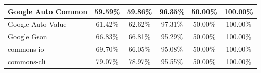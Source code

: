 \documentclass[../../main]{subfiles}
\begin{document}
\begin{table}[htb]
\begin{tabular}{|l|c|c|c|c|c|}
Google Auto Common            & 59.59\%                                                                                 & 59.86\%                                                                                     & 96.35\%                                                                              & 50.00\%                                                                               & 100.00\%                                                                             \\ \hline
Google Auto Value             & 61.42\%                                                                                 & 62.62\%                                                                                     & 97.31\%                                                                              & 50.00\%                                                                               & 100.00\%                                                                             \\ \hline
Google Gson                   & 66.83\%                                                                                 & 66.81\%                                                                                     & 95.29\%                                                                              & 50.00\%                                                                               & 100.00\%                                                                             \\ \hline
commons-io                    & 69.70\%                                                                                 & 66.05\%                                                                                     & 95.08\%                                                                              & 50.00\%                                                                               & 100.00\%                                                                             \\ \hline
commons-cli                   & 79.07\%                                                                                 & 78.97\%                                                                                     & 95.55\%                                                                              & 50.00\%                                                                               & 100.00\%                                                                             \\ \hline

\end{tabular}
\end{table}
\end{document}
